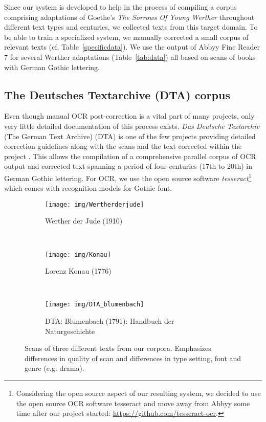 \documentclass[11pt,letterpaper]{article}
\begin{document}
Since our system is developed to help in the process of compiling a corpus comprising adaptations of Goethe's \textit{The Sorrows Of Young Werther} throughout different text types and centuries, we collected texts from this target domain. To be able to train a specialized system, we manually corrected a small corpus of relevant texts (cf. Table~\ref{specificdata}). We use the output of Abbyy Fine Reader 7 for several Werther adaptations (Table~\ref{tab:data}) all based on scans of books with German Gothic lettering.\\


\subsection{The Deutsches Textarchive (DTA) corpus}\label{DTA}
Even though manual OCR post-correction is a vital part of many projects, only very little detailed 
documentation of this process exists. \textit{Das Deutsche Textarchiv} (The German Text Archive) (DTA) is one 
of the few projects providing detailed correction guidelines along with the scans and the text corrected within the project \cite{Geyken2012}. This allows the compilation of a comprehensive parallel corpus of OCR output and corrected text spanning a period of four centuries (17th to 20th) in German Gothic lettering. For OCR, we use the open source software \textit{tesseract}\footnote{Considering the open source aspect of our resulting system, we decided to use the open source OCR software tesseract and move away from Abbyy some time after our project started: \url{https://github.com/tesseract-ocr}.} \cite{Smith07} which comes with recognition models for Gothic font. 

\begin{figure*} 
\centering
    \begin{subfigure}[b]{0.3\textwidth}
        \texttt{[image: img/Wertherderjude]}
        \caption{Werther der Jude (1910)}
        \label{fig:Wdj}
    \end{subfigure}
    ~ %
    \begin{subfigure}[b]{0.3\textwidth}
        \texttt{[image: img/Konau]}
        \caption{Lorenz Konau (1776)}
        \label{fig:konau}
    \end{subfigure}
    ~ %
    \begin{subfigure}[b]{0.35\textwidth}
        \centering
        \texttt{[image: img/DTA\_blumenbach]}
        \caption{DTA: Blumenbach (1791): Handbuch der Naturgeschichte}
        \label{fig:DTA}
    \end{subfigure}
    \caption{Scans of three different texts from our corpora. Emphasizes differences 
    in quality of scan and differences in type setting, font and genre (e.g. drama).}\label{fig:scans}
\end{figure*}
\end{document}
